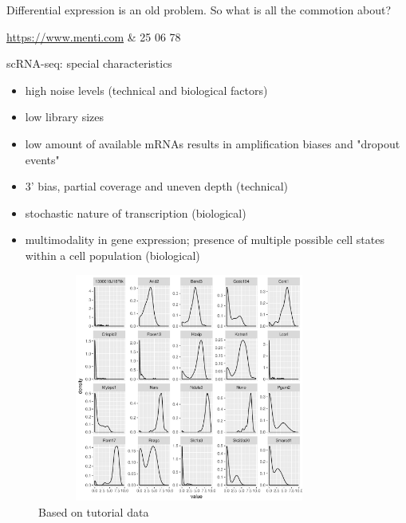 \documentclass{beamer}\usepackage[]{graphicx}\usepackage[]{color}
\begin{document}
\begin{frame}
\begin{center}
\colorbox{blue!10}{Differential expression is an old problem.}
\colorbox{blue!10}{So what is all the commotion about?}
\end{center}
\begin{center}
\href{https://www.menti.com}{https://www.menti.com} \& 25 06 78 \pause
\end{center}
\vspace{0.5cm}
\begin{block}{scRNA-seq: special characteristics}
\begin{itemize}
 \item high noise levels (technical and biological factors)
  \item low library sizes
  \item low amount of available mRNAs results in amplification biases and "dropout events"
  \item 3' bias, partial coverage and uneven depth (technical)
  \item stochastic nature of transcription (biological)
  \item multimodality in gene expression; presence of multiple possible cell states within a cell population (biological)
 \end{itemize}
\end{block}
\end{frame}

\begin{frame}
\begin{center}
\begin{figure}
\includegraphics[width=10cm, height=7.5cm]{Images/ZeroInflated-biomodal.pdf}
\caption{Based on tutorial data}
\end{figure}
\end{center}
\end{frame}
\end{document}
